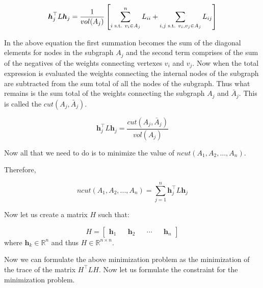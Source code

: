 \documentclass[english]{article}
\theoremstyle{plain}
\begin{document}
\begin{equation}
\boldsymbol{h}_{j}^{\top}L\boldsymbol{h}_{j} = \frac{1}{vol(A_{j})}\left[\sum_{i \textnormal{ s.t. } v_{i} \in A_{j}}^{n} L_{ii} + \sum_{i,j \textnormal{ s.t. }v_{i},v_{j} \in A_{j}} L_{ij}\right]
\end{equation}

In the above equation the first summation becomes the sum of the diagonal elements for nodes in the subgraph $A_{j}$ and the second term comprises of the sum of the negatives of the weights connecting vertexes $v_{i}$ and $v_{j}$. Now when the total expression is evaluated the weights connecting the internal nodes of the subgraph are subtracted from the sum total of all the nodes of the subgraph. Thus what remains is the sum total of the weights connecting the subgraph $A_{j}$ and $\bar{A}_{j}$. This is called the $cut(A_{j},\bar{A}_{j})$.

\begin{equation}
\boldsymbol{h}_{j}^{\top}L\boldsymbol{h}_{j} = \frac{cut(A_{j},\bar{A}_{j})}{vol(A_{j})}
\end{equation}

Now all that we need to do is to minimize the value of $ncut(A_{1}, A_{2},...,A_{n})$.

Therefore,

\begin{equation}
ncut(A_{1}, A_{2},...,A_{n}) = \sum_{j=1}^{n} \boldsymbol{h}_{j}^{\top}L\boldsymbol{h}_{j}
\end{equation}

Now let us create a matrix $H$ such that:

\begin{equation}
H=
\begin{bmatrix}
\boldsymbol{h}_{1} && \boldsymbol{h}_{2} && \cdots && \boldsymbol{h}_{n} 
\end{bmatrix}
\end{equation}
where $\boldsymbol{h}_{k} \in \mathbb{R}^{n} $
and thus $H \in \mathbb{R}^{n\times n}$.

Now we can formulate the above minimization problem as the minimization of the trace of the matrix $H^{\top}LH$. Now let us formulate the constraint for the minimization problem.
\end{document}
